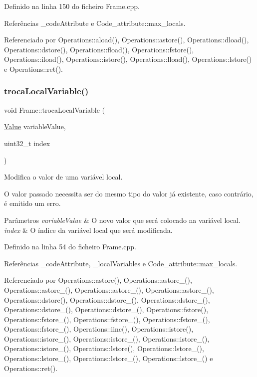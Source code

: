 Definido na linha 150 do ficheiro Frame.\+cpp.



Referências \+\_\+code\+Attribute e Code\+\_\+attribute\+::max\+\_\+locals.



Referenciado por Operations\+::aload(), Operations\+::astore(), Operations\+::dload(), Operations\+::dstore(), Operations\+::fload(), Operations\+::fstore(), Operations\+::iload(), Operations\+::istore(), Operations\+::lload(), Operations\+::lstore() e Operations\+::ret().

\mbox{\label{classFrame_adfa57fa3049213f13beba10ba7152500}} 
\subsubsection{\texorpdfstring{troca\+Local\+Variable()}{trocaLocalVariable()}}
{\footnotesize\ttfamily void Frame\+::troca\+Local\+Variable (\begin{DoxyParamCaption}\item[{\hyperlink{structValue}{Value}}]{variable\+Value,  }\item[{uint32\+\_\+t}]{index }\end{DoxyParamCaption})}



Modifica o valor de uma variável local. 

O valor passado necessita ser do mesmo tipo do valor já existente, caso contrário, é emitido um erro. 
\begin{DoxyParams}{Parâmetros}
{\em variable\+Value} & O novo valor que será colocado na variável local. \\
\hline
{\em index} & O índice da variável local que será modificada. \\
\hline
\end{DoxyParams}


Definido na linha 54 do ficheiro Frame.\+cpp.



Referências \+\_\+code\+Attribute, \+\_\+local\+Variables e Code\+\_\+attribute\+::max\+\_\+locals.



Referenciado por Operations\+::astore(), Operations\+::astore\+\_(), Operations\+::astore\+\_(), Operations\+::astore\+\_(), Operations\+::astore\+\_(), Operations\+::dstore(), Operations\+::dstore\+\_(), Operations\+::dstore\+\_(), Operations\+::dstore\+\_(), Operations\+::dstore\+\_(), Operations\+::fstore(), Operations\+::fstore\+\_(), Operations\+::fstore\+\_(), Operations\+::fstore\+\_(), Operations\+::fstore\+\_(), Operations\+::iinc(), Operations\+::istore(), Operations\+::istore\+\_(), Operations\+::istore\+\_(), Operations\+::istore\+\_(), Operations\+::istore\+\_(), Operations\+::lstore(), Operations\+::lstore\+\_(), Operations\+::lstore\+\_(), Operations\+::lstore\+\_(), Operations\+::lstore\+\_() e Operations\+::ret().




